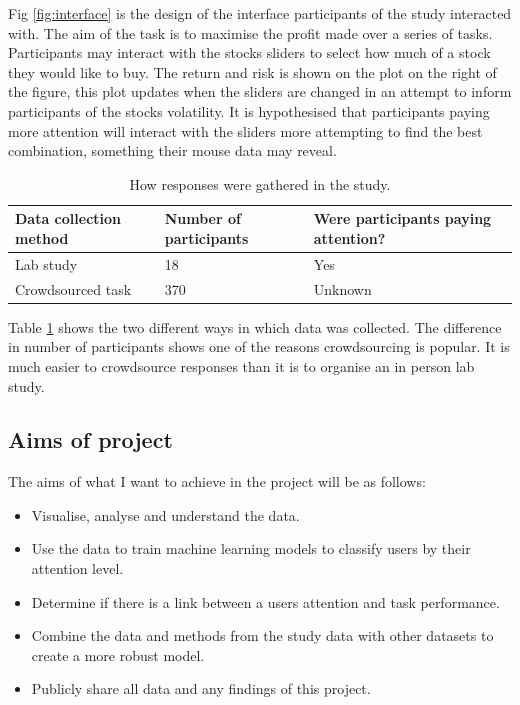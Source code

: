 \documentclass{article}
\begin{document}
Fig \ref{fig:interface} is the design of the interface participants of the study interacted with.
The aim of the task is to maximise the profit made over a series of tasks.
Participants may interact with the stocks sliders to select how much of a stock they would like to buy.
The return and risk is shown on the plot on the right of the figure, this plot updates when the sliders are changed in an attempt to inform participants of the stocks volatility.
It is hypothesised that participants paying more attention will interact with the sliders more attempting to find the best combination, something their mouse data may reveal.

\begin{table}[ht]
    \caption{\label{table:studies} How responses were gathered in the study.}
    \small
    \begin{tabular}{lll}
        \hline
        Data collection method & Number of participants & Were participants paying attention? \\    \hline
        Lab study              & 18                     & Yes                                 \\
        Crowdsourced task      & 370                    & Unknown                             \\    \hline
    \end{tabular}
\end{table}

Table \ref{table:studies} shows the two different ways in which data was collected.
The difference in number of participants shows one of the reasons crowdsourcing is popular. 
It is much easier to crowdsource responses than it is to organise an in person lab study.


\subsection{Aims of project}

The aims of what I want to achieve in the project will be as follows:
\begin{itemize}
    \item Visualise, analyse and understand the data.
    \item Use the data to train machine learning models to classify users by their attention level.
    \item Determine if there is a link between a users attention and task performance.
    \item Combine the data and methods from the study data with other datasets to create a more robust model.
    \item Publicly share all data and any findings of this project.
\end{itemize}
\end{document}
